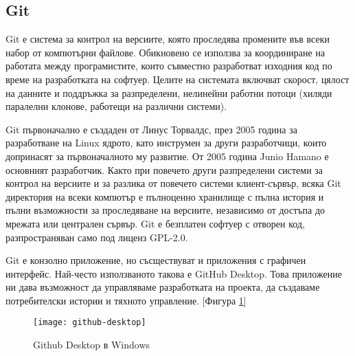 \subsection{Git}
Git е система за контрол на версиите, която проследява промените във всеки
набор от компютърни файлове. Обикновено се използва за координиране на работата
между програмистите, които съвместно разработват изходния код по време на
разработката на софтуер. Целите на системата включват скорост, цялост на
данните и поддръжка за разпределени, нелинейни работни потоци (хиляди паралелни
клонове, работещи на различни системи).

Git първоначално е създаден от Линус Торвалдс, през 2005 година за разработване
на Linux ядрото, като инструмен за други разработчици, които допринасят за
първоначалното му развитие. От 2005 година Junio Hamano е основният
разработчик. Както при повечето други разпределени системи за контрол на
версиите и за разлика от повечето системи клиент-сървър, всяка Git директория
на всеки компютър е пълноценно хранилище с пълна история и пълни възможности за
проследяване на версиите, независимо от достъпа до мрежата или централен
сървър. Git е безплатен софтуер с отворен код, разпространяван само под лиценз
GPL-2.0. \cite{git_wikipedia}

Git е конзолно приложение, но съсществуват и приложения с графичен интерфейс.
Най-често използваното такова е GitHub Desktop. Това приложение ни дава
възможност да управляваме разработката на проекта, да създаваме потребителски
истории и тяхното управление. [Фигура \ref{fig:github-desktop}]
\cite{github_desktop}

\begin{figure}[!htb]
  \texttt{[image: github-desktop]}
  \centering
  \caption{Github Desktop в Windows}
  \label{fig:github-desktop}
\end{figure}

